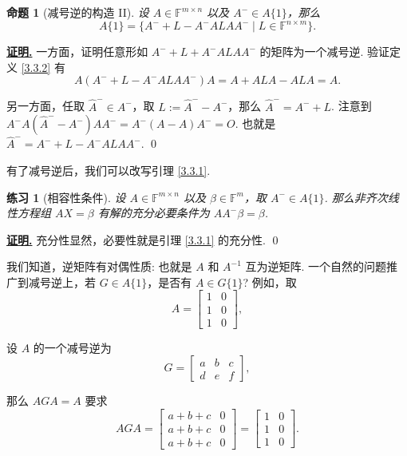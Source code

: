 \documentclass[10pt,openany]{article}
\theoremstyle{thmstyle} %
\newtheorem{practice}{练习}[section]
\theoremstyle{defstyle} %
\theoremstyle{prostyle} %
\newtheorem{proposition}[theorem]{命题}
\theoremstyle{exastyle}
\theoremstyle{remstyle}
\renewenvironment{proof}[1][证明]{\par\underline{\textbf{#1.}} \;\fangsong}{\qed\par}
\newcommand{\F}{\mathbb{F}}
\newcommand{\mn}{^{m \times n}}
\newcommand{\nm}{^{n \times m}}
\begin{document}
\begin{proposition}[减号逆的构造 II]
	设 \( A \in \F\mn \) 以及 \( A^{-} \in A\{1\} \)，那么
	\[ A\{1\}=\{A^{-}+L-A^{-}ALAA^{-} \mid L \in \F\nm \}. \]
\end{proposition}

\begin{proof}
	一方面，证明任意形如 \( A^{-}+L+A^{-}ALAA^{-}  \) 的矩阵为一个减号逆. 验证定义 \ref{3.3.2} 有 
	\[ A(A^{-}+L-A^{-}ALAA^{-})A=A+ALA-ALA=A. \]
	
	另一方面，任取 \( \hat{A}^{-} \in A^{-} \)，取 \( L:=\hat{A}^{-}-A^{-} \)，那么 \( \hat{A}^{-}=A^{-}+L \). 注意到 \( A^{-}A(\hat{A}^{-}-A^{-})AA^{-}=A^{-}(A-A)A^{-}=O \). 也就是 \( \hat{A}^{-}=A^{-}+L-A^{-}ALAA^{-} \).
\end{proof}

有了减号逆后，我们可以改写引理 \ref{3.3.1}.

\begin{practice}[相容性条件] \label{prac3.16}
	设 \( A \in \F\mn \) 以及 \( \beta \in \F^m \)，取 \( A^{-} \in A\{1\} \). 那么非齐次线性方程组 \( AX=\beta \) 有解的充分必要条件为 \( AA^{-}\beta=\beta \).
\end{practice}

\begin{proof}
	充分性显然，必要性就是引理 \ref{3.3.1} 的充分性.
\end{proof}

我们知道，逆矩阵有对偶性质: 也就是 \( A \) 和 \( A^{-1} \) 互为逆矩阵. 一个自然的问题推广到减号逆上，若 \( G \in A\{1\} \)，是否有 \( A \in G\{1\} \)? 例如，取
\[ A=\begin{bmatrix}
	1 & 0 \\ 1 & 0 \\ 1 & 0
\end{bmatrix}, \]

设 \( A \) 的一个减号逆为 
\[ G=\begin{bmatrix}
	a & b & c \\
	d & e & f
\end{bmatrix}, \]

那么 \( AGA=A \) 要求
\[ AGA=\begin{bmatrix}
	a+b+c & 0 \\ a+b+c & 0 \\ a+b+c & 0
\end{bmatrix}=\begin{bmatrix}
1 & 0 \\ 1 & 0 \\ 1 & 0
\end{bmatrix}. \]
\end{document}
